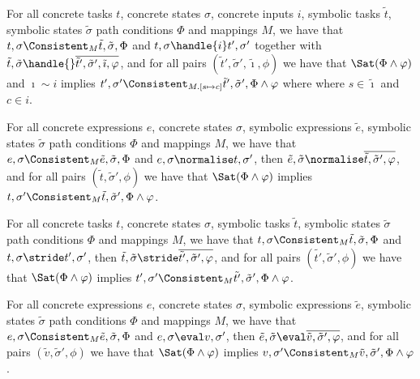 \begin{lemma}
  \label{lem:completeHandle}
  For all concrete tasks $t$, concrete states $\sigma$, concrete inputs $i$, symbolic tasks $\tilde{t}$, symbolic states $\tilde{\sigma}$ path conditions $\Phi$ and mappings $M$,
  we have that $t,\sigma\Consistent_{M}\tilde{t},\tilde{\sigma},\Phi$ and
  $t,\sigma\handle{i}t',\sigma'$ together with
  $\tilde{t},\tilde{\sigma}\handle{}\overline{\tilde{t}',\tilde{\sigma}',\tilde{\imath},\phi}$,
  and for all pairs $(\tilde{t}',\tilde{\sigma}',\tilde{\imath},\phi)$ we have that $\Sat(\Phi\land\phi)$ and $\imath\sim i$ implies $t',\sigma'\Consistent_{M.[s\mapsto c]}\tilde{t}',\tilde{\sigma}',\Phi\land\phi$ where where $s\in\tilde{\imath}$ and $c\in i$.
\end{lemma}

\begin{lemma}
  \label{lem:completeNormalise}
  For all concrete expressions $e$, concrete states $\sigma$, symbolic expressions $\tilde{e}$, symbolic states $\tilde{\sigma}$ path conditions $\Phi$ and mappings $M$,
  we have that $e,\sigma\Consistent_{M}\tilde{e},\tilde{\sigma},\Phi$
  and $e,\sigma\normalise t,\sigma'$,
  then $\tilde{e},\tilde{\sigma}\normalise\overline{\tilde{t},\tilde{\sigma}',\phi}$,
  and for all pairs $(\tilde{t},\tilde{\sigma}',\phi)$ we have that $\Sat(\Phi\land\phi)$ implies $t,\sigma'\Consistent_{M}\tilde{t},\tilde{\sigma}',\Phi\land\phi$.
\end{lemma}

\begin{lemma}
  \label{lem:completeStride}
  For all concrete tasks $t$, concrete states $\sigma$, symbolic tasks $\tilde{t}$, symbolic states $\tilde{\sigma}$ path conditions $\Phi$ and mappings $M$,
  we have that $t,\sigma\Consistent_{M}\tilde{t},\tilde{\sigma},\Phi$
  and $t,\sigma\stride t',\sigma'$,
  then $\tilde{t},\tilde{\sigma}\stride\overline{\tilde{t'},\tilde{\sigma}',\phi}$,
  and for all pairs $(\tilde{t'},\tilde{\sigma}',\phi)$ we have that $\Sat(\Phi\land\phi)$ implies $t',\sigma'\Consistent_{M}\tilde{t'},\tilde{\sigma}',\Phi\land\phi$.
\end{lemma}

\begin{lemma}
  \label{lem:completeEval}
  For all concrete expressions $e$, concrete states $\sigma$, symbolic expressions $\tilde{e}$, symbolic states $\tilde{\sigma}$ path conditions $\Phi$ and mappings $M$,
  we have that $e,\sigma\Consistent_{M}\tilde{e},\tilde{\sigma},\Phi$
  and $e,\sigma\eval v,\sigma'$,
  then $\tilde{e},\tilde{\sigma}\eval\overline{\tilde{v},\tilde{\sigma}',\phi}$,
  and for all pairs $(\tilde{v},\tilde{\sigma}',\phi)$ we have that $\Sat(\Phi\land\phi)$ implies $v,\sigma'\Consistent_{M}\tilde{v},\tilde{\sigma}',\Phi\land\phi$.
\end{lemma}

